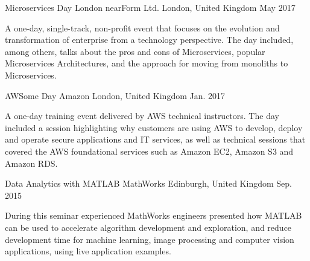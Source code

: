 

\begin{cventries}

  \cventry
    {Microservices Day London} %
    {nearForm Ltd.} %
    {London, United Kingdom} %
    {May 2017} %
    {
      \begin{cvitems} %
        \item {A one-day, single-track, non-profit event that focuses on the evolution and transformation of enterprise from a technology perspective. The day included, among others, talks about the pros and cons of Microservices, popular Microservices Architectures, and the approach for moving from monoliths to Microservices.}
      \end{cvitems}
    }

  \cventry
    {AWSome Day} %
    {Amazon} %
    {London, United Kingdom} %
    {Jan. 2017} %
    {
      \begin{cvitems} %
        \item {A one-day training event delivered by AWS technical instructors. The day included a session highlighting why customers are using AWS to develop, deploy and operate secure applications and IT services, as well as technical sessions that covered the AWS foundational services such as Amazon EC2, Amazon S3 and Amazon RDS.}
      \end{cvitems}
    }
    
  \cventry
    {Data Analytics with MATLAB} %
    {MathWorks} %
    {Edinburgh, United Kingdom} %
    {Sep. 2015} %
    {
      \begin{cvitems} %
        \item {During this seminar experienced MathWorks engineers presented how MATLAB can be used to accelerate algorithm development and exploration, and reduce development time for machine learning, image processing and computer vision applications, using live application examples.}
      \end{cvitems}
    }
    

\end{cventries}
